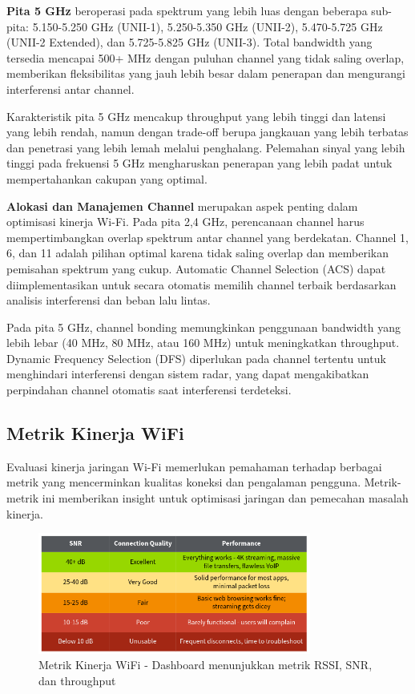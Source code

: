 \textbf{Pita 5 GHz} beroperasi pada spektrum yang lebih luas dengan beberapa sub-pita: 5.150-5.250 GHz (UNII-1), 5.250-5.350 GHz (UNII-2), 5.470-5.725 GHz (UNII-2 Extended), dan 5.725-5.825 GHz (UNII-3). Total bandwidth yang tersedia mencapai 500+ MHz dengan puluhan channel yang tidak saling overlap, memberikan fleksibilitas yang jauh lebih besar dalam penerapan dan mengurangi interferensi antar channel.

Karakteristik pita 5 GHz mencakup throughput yang lebih tinggi dan latensi yang lebih rendah, namun dengan trade-off berupa jangkauan yang lebih terbatas dan penetrasi yang lebih lemah melalui penghalang. Pelemahan sinyal yang lebih tinggi pada frekuensi 5 GHz mengharuskan penerapan yang lebih padat untuk mempertahankan cakupan yang optimal.

\textbf{Alokasi dan Manajemen Channel} merupakan aspek penting dalam optimisasi kinerja Wi-Fi. Pada pita 2,4 GHz, perencanaan channel harus mempertimbangkan overlap spektrum antar channel yang berdekatan. Channel 1, 6, dan 11 adalah pilihan optimal karena tidak saling overlap dan memberikan pemisahan spektrum yang cukup. Automatic Channel Selection (ACS) dapat diimplementasikan untuk secara otomatis memilih channel terbaik berdasarkan analisis interferensi dan beban lalu lintas.

Pada pita 5 GHz, channel bonding memungkinkan penggunaan bandwidth yang lebih lebar (40 MHz, 80 MHz, atau 160 MHz) untuk meningkatkan throughput. Dynamic Frequency Selection (DFS) diperlukan pada channel tertentu untuk menghindari interferensi dengan sistem radar, yang dapat mengakibatkan perpindahan channel otomatis saat interferensi terdeteksi.

\subsection{Metrik Kinerja WiFi}

Evaluasi kinerja jaringan Wi-Fi memerlukan pemahaman terhadap berbagai metrik yang mencerminkan kualitas koneksi dan pengalaman pengguna. Metrik-metrik ini memberikan insight untuk optimisasi jaringan dan pemecahan masalah kinerja.

\begin{figure}[htbp]
    \centering
    \includegraphics[width=0.8\textwidth]{assets/pics/bab3_5.png}
    \caption{Metrik Kinerja WiFi - Dashboard menunjukkan metrik RSSI, SNR, dan throughput}
    \label{fig:wifi_performance_metrics}
\end{figure}

